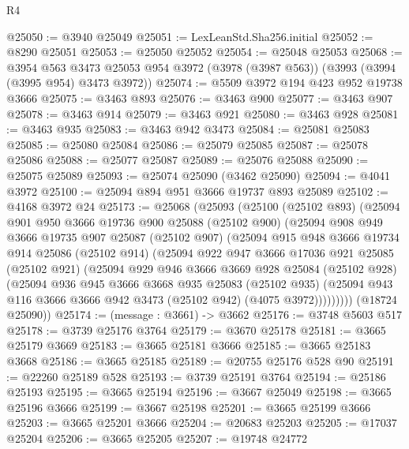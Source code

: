 \begin{lexlean}{R4}
\begin{coremodule}
@25050 := @3940 @25049
@25051 := LexLeanStd.Sha256.initial
@25052 := @8290 @25051
@25053 := @25050 @25052
@25054 := @25048 @25053
@25068 := @3954
    @563
    @3473
    @25053
    @954
    @3972
    (@3978 (@3987 @563))
    (@3993 (@3994 (@3995 @954) @3473 @3972))
@25074 := @5509 @3972 @194 @423 @952 @19738 @3666
@25075 := @3463 @893
@25076 := @3463 @900
@25077 := @3463 @907
@25078 := @3463 @914
@25079 := @3463 @921
@25080 := @3463 @928
@25081 := @3463 @935
@25083 := @3463 @942 @3473
@25084 := @25081 @25083
@25085 := @25080 @25084
@25086 := @25079 @25085
@25087 := @25078 @25086
@25088 := @25077 @25087
@25089 := @25076 @25088
@25090 := @25075 @25089
@25093 := @25074 @25090 (@3462 @25090)
@25094 := @4041 @3972
@25100 := @25094 @894 @951 @3666 @19737 @893 @25089
@25102 := @4168 @3972 @24
@25173 := @25068
    (@25093
      (@25100
        (@25102 @893)
        (@25094
          @901
          @950
          @3666
          @19736
          @900
          @25088
          (@25102 @900)
          (@25094
            @908
            @949
            @3666
            @19735
            @907
            @25087
            (@25102 @907)
            (@25094
              @915
              @948
              @3666
              @19734
              @914
              @25086
              (@25102 @914)
              (@25094
                @922
                @947
                @3666
                @17036
                @921
                @25085
                (@25102 @921)
                (@25094
                  @929
                  @946
                  @3666
                  @3669
                  @928
                  @25084
                  (@25102 @928)
                  (@25094
                    @936
                    @945
                    @3666
                    @3668
                    @935
                    @25083
                    (@25102 @935)
                    (@25094 @943 @116 @3666 @3666 @942 @3473 (@25102 @942) (@4075 @3972)))))))))
      (@18724 @25090))
@25174 := (message : @3661) -> @3662
@25176 := @3748 @5603 @517
@25178 := @3739 @25176 @3764
@25179 := @3670 @25178
@25181 := @3665 @25179 @3669
@25183 := @3665 @25181 @3666
@25185 := @3665 @25183 @3668
@25186 := @3665 @25185
@25189 := @20755 @25176 @528 @90
@25191 := @22260 @25189 @528
@25193 := @3739 @25191 @3764
@25194 := @25186 @25193
@25195 := @3665 @25194
@25196 := @3667 @25049
@25198 := @3665 @25196 @3666
@25199 := @3667 @25198
@25201 := @3665 @25199 @3666
@25203 := @3665 @25201 @3666
@25204 := @20683 @25203
@25205 := @17037 @25204
@25206 := @3665 @25205
@25207 := @19748 @24772

\end{coremodule}
\end{lexlean}
